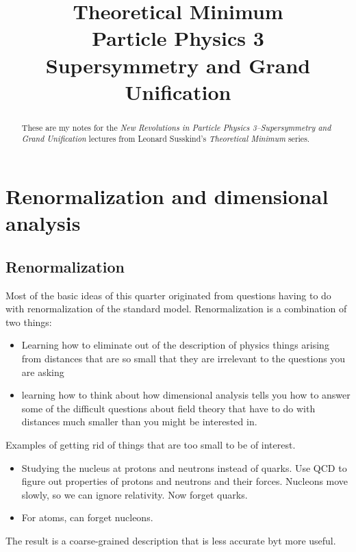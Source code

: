 \documentclass[]{article}
\title{Theoretical Minimum\\Particle Physics 3\\Supersymmetry and Grand Unification}
\author{}
\begin{document}
\maketitle

\begin{abstract}
	These are my notes for the \emph{New Revolutions in Particle Physics 3--Supersymmetry and Grand Unification} lectures from Leonard Susskind's \emph{Theoretical Minimum} series\cite{susskind2010supersymmetry}.
\end{abstract}

\tableofcontents
\listoffigures
\listoftables
\listoftheorems

\section{Renormalization  and dimensional analysis}

\subsection{Renormalization}

Most of the basic ideas of this quarter originated from questions having to do with renormalization of the standard model. Renormalization is a combination of two things:
\begin{itemize}
	\item Learning how to eliminate out of the description of physics things arising from distances that are so small that they are irrelevant to the questions you are asking
	\item learning how to think about how dimensional analysis tells you how to answer some of the difficult questions about field theory that have to do with distances much smaller than you might be interested in.
\end{itemize}

Examples of getting rid of things that are too small to be of interest.
\begin{itemize}
	\item Studying the nucleus at protons and neutrons instead of quarks. Use QCD to figure out properties of protons and neutrons and their forces. Nucleons move slowly, so we can ignore relativity. Now forget quarks.
	\item For atoms, can forget nucleons.
\end{itemize}

The result is a coarse-grained description that is less accurate byt more useful.
\end{document}
